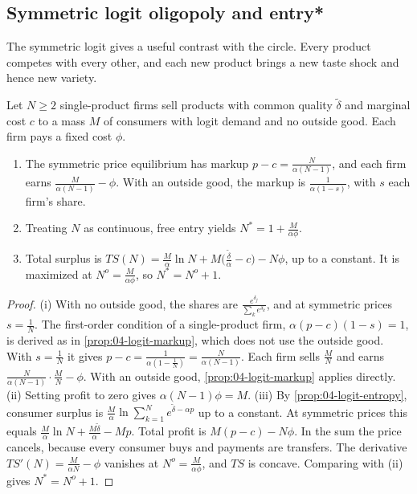 \subsection{Symmetric logit oligopoly and entry*}\label{sec:04-logit-entry}

The symmetric logit gives a useful contrast with the circle. Every product competes with every other, and each new
product brings a new taste shock and hence new variety.

\begin{proposition}\label{prop:04-logit-entry}
Let $N \ge 2$ single-product firms sell products with common quality $\tilde\delta$ and marginal cost $c$ to a mass
$M$ of consumers with logit demand and no outside good. Each firm pays a fixed cost $\phi$.
\begin{enumerate}[label=(\roman*)]
\item The symmetric price equilibrium has markup $p - c = \frac{N}{\alpha(N - 1)}$, and each firm earns
$\frac{M}{\alpha(N - 1)} - \phi$. With an outside good, the markup is $\frac{1}{\alpha(1 - s)}$, with $s$ each
firm's share.
\item Treating $N$ as continuous, free entry yields $N^* = 1 + \frac{M}{\alpha\phi}$.
\item Total surplus is $TS(N) = \frac{M}{\alpha}\ln N + M\big(\frac{\tilde\delta}{\alpha} - c\big) - N\phi$, up to a
constant. It is maximized at $N^o = \frac{M}{\alpha\phi}$, so $N^* = N^o + 1$.
\end{enumerate}
\end{proposition}

\begin{proof}
(i) With no outside good, the shares are $\frac{e^{\delta_j}}{\sum_ke^{\delta_k}}$, and at symmetric prices $s = \frac{1}{N}$.
The first-order condition of a single-product firm, $\alpha(p - c)(1 - s) = 1$, is derived as in
\cref{prop:04-logit-markup}, which does not use the outside good. With $s = \frac{1}{N}$ it gives
$p - c = \frac{1}{\alpha(1 - \frac{1}{N})} = \frac{N}{\alpha(N - 1)}$. Each firm sells $\frac{M}{N}$ and earns
$\frac{N}{\alpha(N-1)}\cdot\frac{M}{N} - \phi$. With an outside good, \cref{prop:04-logit-markup} applies directly.
(ii) Setting profit to zero gives $\alpha(N - 1)\phi = M$.
(iii) By \cref{prop:04-logit-entropy}, consumer surplus is $\frac{M}{\alpha}\ln\sum_{k=1}^Ne^{\tilde\delta - \alpha p}$ up
to a constant. At symmetric prices this equals $\frac{M}{\alpha}\ln N + \frac{M\tilde\delta}{\alpha} - Mp$. Total
profit is $M(p - c) - N\phi$. In the sum the price cancels, because every consumer buys and payments are
transfers. The derivative $TS'(N) = \frac{M}{\alpha N} - \phi$ vanishes at $N^o = \frac{M}{\alpha\phi}$, and $TS$ is
concave. Comparing with (ii) gives $N^* = N^o + 1$.
\end{proof}

